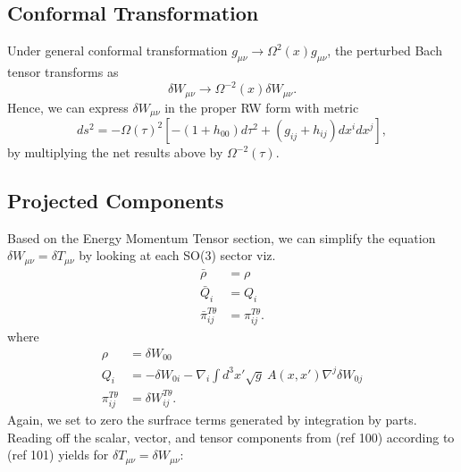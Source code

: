 \documentclass[10pt,letterpaper]{article}
\numberwithin{equation}{subsection}
\begin{document}
\subsection{Conformal Transformation}
Under general conformal transformation $g_{\mu\nu}\to \Omega^2(x)g_{\mu\nu}$, the perturbed Bach tensor transforms as
\begin{equation}
\delta W_{\mu\nu} \to \Omega^{-2}(x) \delta W_{\mu\nu}.
\end{equation}
Hence, we can express $\delta W_{\mu\nu}$ in the proper RW form with metric
\begin{equation}
ds^2 = -\Omega(\tau)^2\left[ -(1+h_{00})d\tau^2 + (g_{ij}+h_{ij})dx^i dx^j\right],
\end{equation}
by multiplying the net results above by $\Omega^{-2}(\tau)$. 
\subsection{Projected Components}
Based on the Energy Momentum Tensor section, we can simplify the equation $\delta W_{\mu\nu} = \delta T_{\mu\nu}$ by looking at each SO(3) sector viz.
\begin{align}
\bar \rho &= \rho
\nonumber\\
\bar Q_i & = Q_i
\nonumber\\
\bar\pi_{ij}^{T\theta} &= \pi_{ij}^{T\theta}.
\end{align}
where
\begin{align}
\rho &= \delta W_{00}
\nonumber \\
Q_i &= -\delta W_{0i} - \nabla_i \int d^3x' \sqrt g\ A(x,x') \nabla^j \delta W_{0j}
\nonumber\\
\pi_{ij}^{T\theta} &= \delta W_{ij}^{T\theta}.
\end{align}
Again, we set to zero the surfrace terms generated by integration by parts. Reading off the scalar, vector, and tensor components from (ref 100) according to (ref 101) yields for $\delta T_{\mu\nu} = \delta W_{\mu\nu}$:
\end{document}
